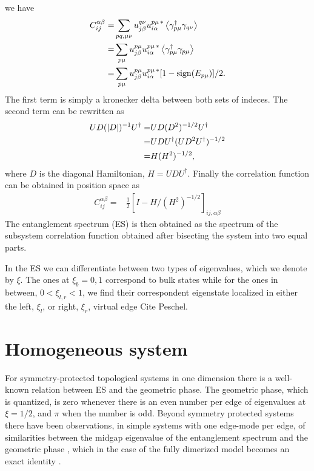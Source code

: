 \documentclass[twocolumn,amsmath,longbibliography,amssymb,superscriptaddress]{revtex4-1}
\newcommand{\carlos}[1]{{\color{red} #1}}
\begin{document}
we have
\begin{align*}
C_{ij}^{\alpha \beta} =& \sum_{pq,\mu\nu} u^{q\nu }_{j\beta} u^{p\mu \, \ast}_{i\alpha} \expval{\gamma^\dagger_{p\mu} \gamma_{q\nu} } \\
=&  \sum_{p\mu} u^{p\mu }_{j\beta} u^{p\mu \, \ast}_{i\alpha} \expval{\gamma^\dagger_{p\mu} \gamma_{p\mu} } \\
=&  \sum_{p\mu} u^{p\mu }_{j\beta} u^{p\mu \, \ast}_{i\alpha} [1-{\rm sign}(E_{p\mu})]/2.
\end{align*}
The first term is simply a kronecker delta between both sets of indeces. The second term can be rewritten as
\begin{align*}
UD(\abs{D})^{-1}U^\dagger =& UD(D^2)^{-1/2}U^\dagger \\
=& U D U^\dagger (U D^2 U^\dagger)^{-1/2} \\
=& H(H^2)^{-1/2},
\end{align*}
where $D$ is the diagonal Hamiltonian, $H=UDU^\dagger$. Finally the correlation function can be obtained in position space as
\begin{align*}
C_{ij}^{\alpha \beta} =& \frac{1}{2}\left[I - H/ (H^2)^{-1/2} \right]_{ij, \alpha \beta}
\end{align*}
The entanglement spectrum (ES) is then obtained as the spectrum of the subsystem correlation function obtained after bisecting the system into two equal parts. 

In the ES we can differentiate between two types of eigenvalues, which we denote by $\xi$. The ones at $\xi_b = 0,1$ correspond to bulk states while for the ones in between, $0<\xi_{l,r}<1$, we find their correspondent eigenstate localized in either the left, $\xi_l$, or right, $\xi_r$, virtual edge \carlos{Cite Peschel}. 

\section{Homogeneous system}

For symmetry-protected topological systems in one dimension there is a well-known relation between ES and the geometric phase. The geometric phase, which is quantized, is zero whenever there is an even number per edge of eigenvalues at $\xi = 1/2$, and $\pi$ when the number is odd. Beyond symmetry protected systems there have been observations, in simple systems with one edge-mode per edge, of similarities between the midgap eigenvalue of the entanglement spectrum and the geometric phase \cite{Ryu2006,Huang2012,Huang2012-2}, which in the case of the fully dimerized model becomes an exact identity \cite{Ryu2006}. 
\end{document}

